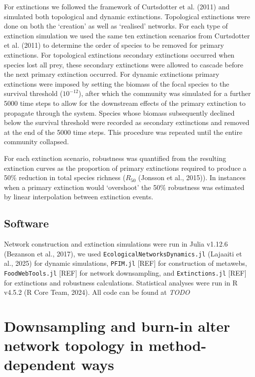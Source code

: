 \documentclass[
]{article}
\begin{document}
For extinctions we followed the framework of Curtsdotter et al. (2011)
and simulated both topological and dynamic extinctions. Topological
extinctions were done on both the `creation' as well as `realised'
networks. For each type of extinction simulation we used the same ten
extinction scenarios from Curtsdotter et al. (2011) to determine the
order of species to be removed for primary extinctions. For topological
extinctions secondary extinctions occurred when species lost all prey,
these secondary extinctions were allowed to cascade before the next
primary extinction occurred. For dynamic extinctions primary extinctions
were imposed by setting the biomass of the focal species to the survival
threshold (\(10^{-12}\)), after which the community was simulated for a
further 5000 time steps to allow for the downstream effects of the
primary extinction to propagate through the system. Species whose
biomass subsequently declined below the survival threshold were recorded
as secondary extinctions and removed at the end of the 5000 time steps.
This procedure was repeated until the entire community collapsed.

For each extinction scenario, robustness was quantified from the
resulting extinction curves as the proportion of primary extinctions
required to produce a 50\% reduction in total species richness
(\(R_{50}\) (Jonsson et al., 2015)). In instances when a primary
extinction would `overshoot' the 50\% robustness was estimated by linear
interpolation between extinction events.

\subsection{Software}\label{software}

Network construction and extinction simulations were run in Julia
v1.12.6 (Bezanson et al., 2017), we used
\texttt{EcologicalNetworksDynamics.jl} (Lajaaiti et al., 2025) for
dynamic simulations, \texttt{PFIM.jl} {[}REF{]} for construction of
metawebs, \texttt{FoodWebTools.jl} {[}REF{]} for network downsampling,
and \texttt{Extinctions.jl} {[}REF{]} for extinctions and robustness
calculations. Statistical analyses were run in R v4.5.2 (R Core Team,
2024). All code can be found at \emph{TODO}

\section{Downsampling and burn-in alter network topology in
method-dependent
ways}\label{downsampling-and-burn-in-alter-network-topology-in-method-dependent-ways}
\end{document}
